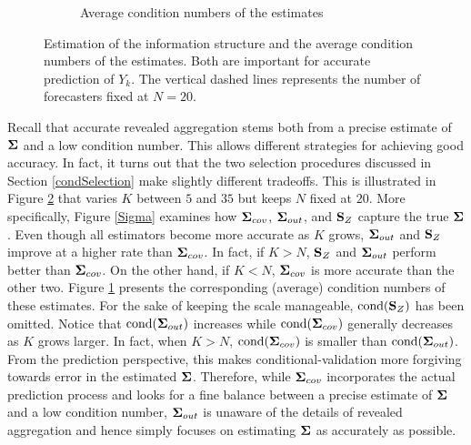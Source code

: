 \documentclass[11pt]{article}
\theoremstyle{definition}
\theoremstyle{definition}
\def\bSigma{{\bf \Sigma}}
\def\SS{{\bf S}}
\def\cond{\text{cond}}
\begin{document}
\begin{figure}[t!]
\begin{subfigure}{0.5\textwidth}
                \caption{Average condition numbers of the estimates}
                                \label{SigmaInv}
        \end{subfigure}
        \caption{Estimation of the information structure and the average  condition numbers of the estimates. Both are important for accurate prediction of $Y_k$. The vertical dashed lines represents the number of forecasters fixed at $N = 20$.}
        \label{SigmaEstimation}
\end{figure}


Recall  that accurate revealed aggregation stems both from a precise estimate of $\bSigma$ and a low condition number. This allows different strategies for achieving good accuracy. In fact, it turns out that the two selection procedures discussed in Section \ref{condSelection} make slightly different tradeoffs. This is illustrated in  Figure \ref{SigmaEstimation} that varies $K$ between $5$ and $35$ but keeps $N$ fixed at $20$. More specifically,  Figure \ref{Sigma} examines how $\bSigma_{cov}$,  $\bSigma_{out}$, and $\SS_Z$ capture the true $\bSigma$. 
Even though all estimators become more accurate as $K$ grows, $\bSigma_{out}$ and $\SS_Z$ improve at a higher rate than $\bSigma_{cov}$.  In fact, if $K > N$, $\SS_Z$ and $\bSigma_{out}$ perform better than $\bSigma_{cov}$. On the other hand, if $K < N$, $\bSigma_{cov}$ is more accurate than the other two. Figure \ref{SigmaInv}  presents the corresponding (average) condition numbers of these estimates. For the sake of keeping the scale manageable, $\cond(\SS_Z)$ has been omitted. Notice that $\cond(\bSigma_{out})$ increases while $\cond(\bSigma_{cov})$ generally decreases as $K$ grows larger. In fact, when $K > N$,  $\cond(\bSigma_{cov})$ is smaller than $\cond(\bSigma_{out})$. From the prediction perspective, this makes conditional-validation more forgiving towards error in the estimated $\bSigma$. Therefore, while $\bSigma_{cov}$ incorporates the actual prediction process and looks for a fine balance between a precise estimate of $\bSigma$ and a low condition number, $\bSigma_{out}$ is unaware of the details of revealed aggregation and hence simply focuses on estimating $\bSigma$ as accurately as possible. 



\end{document}
